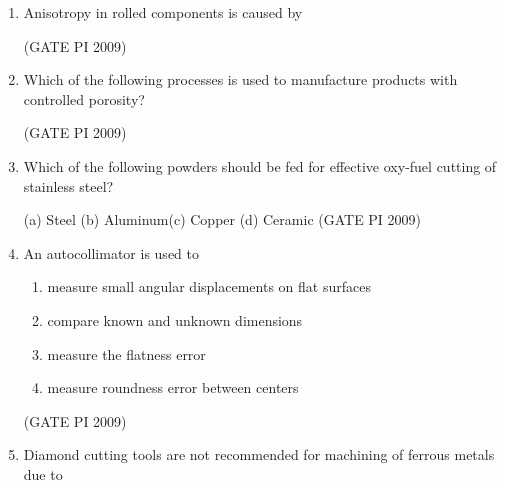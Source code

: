 \documentclass[journal,12pt,onecolumn]{IEEEtran}
\theoremstyle{remark}
\begin{document}
\begin{enumerate}[label=Q.\arabic*]
(a) 14400 \hfill(b) 28800\hfill  (c) 57600 \hfill (d) 72000 \\
 
\hfill (GATE PI 2009)
\item Anisotropy in rolled components is caused by
\begin{enumerate}
\end{enumerate}
\hfill (GATE PI 2009)
\item Which of the following processes is used to manufacture products with controlled porosity?
\begin{enumerate}
\end{enumerate}
\hfill (GATE PI 2009)
\item Which of the following powders should be fed for effective oxy-fuel cutting of stainless steel?

(a) Steel \hfill (b) Aluminum\hfill (c) Copper \hfill (d) Ceramic 
\hfill (GATE PI 2009)
\item An autocollimator is used to

\begin{enumerate}
\item measure small angular displacements on flat surfaces
\item compare known and unknown dimensions
\item measure the flatness error
\item measure roundness error between centers
\end{enumerate}
\hfill (GATE PI 2009)
\item Diamond cutting tools are not recommended for machining of ferrous metals due to


\end{enumerate}
\end{document}
